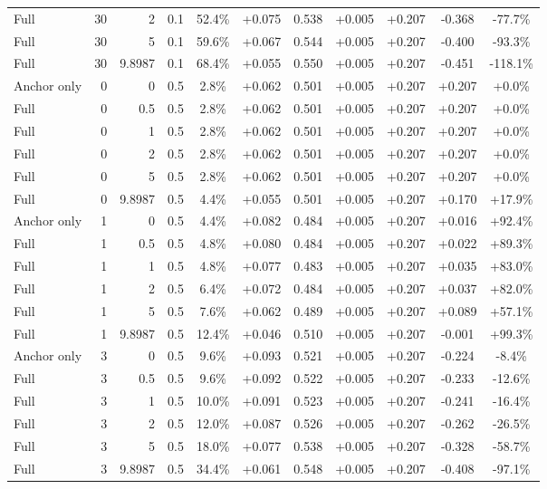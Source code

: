 \begin{table}[htbp]
\begin{tabular}{lrrrccccccc}
Full & 30 & 2 & 0.1 & 52.4\% & +0.075 & 0.538 & +0.005 & +0.207 & -0.368 & -77.7\% \\
Full & 30 & 5 & 0.1 & 59.6\% & +0.067 & 0.544 & +0.005 & +0.207 & -0.400 & -93.3\% \\
Full & 30 & 9.8987 & 0.1 & 68.4\% & +0.055 & 0.550 & +0.005 & +0.207 & -0.451 & -118.1\% \\
Anchor only & 0 & 0 & 0.5 & 2.8\% & +0.062 & 0.501 & +0.005 & +0.207 & +0.207 & +0.0\% \\
Full & 0 & 0.5 & 0.5 & 2.8\% & +0.062 & 0.501 & +0.005 & +0.207 & +0.207 & +0.0\% \\
Full & 0 & 1 & 0.5 & 2.8\% & +0.062 & 0.501 & +0.005 & +0.207 & +0.207 & +0.0\% \\
Full & 0 & 2 & 0.5 & 2.8\% & +0.062 & 0.501 & +0.005 & +0.207 & +0.207 & +0.0\% \\
Full & 0 & 5 & 0.5 & 2.8\% & +0.062 & 0.501 & +0.005 & +0.207 & +0.207 & +0.0\% \\
Full & 0 & 9.8987 & 0.5 & 4.4\% & +0.055 & 0.501 & +0.005 & +0.207 & +0.170 & +17.9\% \\
Anchor only & 1 & 0 & 0.5 & 4.4\% & +0.082 & 0.484 & +0.005 & +0.207 & +0.016 & +92.4\% \\
Full & 1 & 0.5 & 0.5 & 4.8\% & +0.080 & 0.484 & +0.005 & +0.207 & +0.022 & +89.3\% \\
Full & 1 & 1 & 0.5 & 4.8\% & +0.077 & 0.483 & +0.005 & +0.207 & +0.035 & +83.0\% \\
Full & 1 & 2 & 0.5 & 6.4\% & +0.072 & 0.484 & +0.005 & +0.207 & +0.037 & +82.0\% \\
Full & 1 & 5 & 0.5 & 7.6\% & +0.062 & 0.489 & +0.005 & +0.207 & +0.089 & +57.1\% \\
Full & 1 & 9.8987 & 0.5 & 12.4\% & +0.046 & 0.510 & +0.005 & +0.207 & -0.001 & +99.3\% \\
Anchor only & 3 & 0 & 0.5 & 9.6\% & +0.093 & 0.521 & +0.005 & +0.207 & -0.224 & -8.4\% \\
Full & 3 & 0.5 & 0.5 & 9.6\% & +0.092 & 0.522 & +0.005 & +0.207 & -0.233 & -12.6\% \\
Full & 3 & 1 & 0.5 & 10.0\% & +0.091 & 0.523 & +0.005 & +0.207 & -0.241 & -16.4\% \\
Full & 3 & 2 & 0.5 & 12.0\% & +0.087 & 0.526 & +0.005 & +0.207 & -0.262 & -26.5\% \\
Full & 3 & 5 & 0.5 & 18.0\% & +0.077 & 0.538 & +0.005 & +0.207 & -0.328 & -58.7\% \\
Full & 3 & 9.8987 & 0.5 & 34.4\% & +0.061 & 0.548 & +0.005 & +0.207 & -0.408 & -97.1\% \\

\end{tabular}
\end{table}
